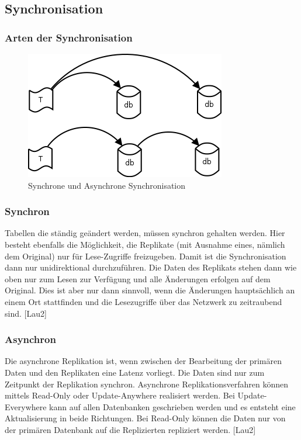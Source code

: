 \documentclass[letterpaper, 12pt]{article}
\let\tempsubsection\subsection
\renewcommand\subsection[1]{\vspace{0cm}\tempsubsection{#1}\vspace{0cm}}
\let\tempsubsubsection\subsubsection
\renewcommand\subsubsection[1]{\vspace{0cm}\tempsubsubsection{#1}\vspace{0cm}}
\begin{document}
\subsection{Synchronisation}
\subsubsection{Arten der Synchronisation}
\begin{figure}[hp]
\centering
\includegraphics[scale=0.80]{syn.png}
\caption{Synchrone und Asynchrone Synchronisation}
\label{syn}
\end{figure}
\subsubsection{Synchron}
Tabellen die ständig geändert werden, müssen synchron gehalten werden. Hier besteht ebenfalls die Möglichkeit, die Replikate (mit Ausnahme eines, nämlich dem Original) nur für Lese-Zugriffe freizugeben. Damit ist die Synchronisation dann nur unidirektional durchzuführen. Die Daten des Replikats stehen dann wie oben nur zum Lesen zur Verfügung und alle Änderungen erfolgen auf dem Original. Dies ist aber nur dann sinnvoll, wenn die Änderungen hauptsächlich an einem Ort stattfinden und die Lesezugriffe über das Netzwerk zu zeitraubend sind. [Lau2]
\subsubsection{Asynchron}
Die asynchrone Replikation ist, wenn zwischen der Bearbeitung der primären Daten und den Replikaten eine Latenz vorliegt. Die Daten sind nur zum Zeitpunkt der Replikation synchron. Asynchrone Replikationsverfahren können mittels Read-Only oder Update-Anywhere realisiert werden. Bei Update-Everywhere kann auf allen Datenbanken geschrieben werden und es entsteht eine Aktualisierung in beide Richtungen. Bei Read-Only können die Daten nur von der primären Datenbank auf die Replizierten repliziert werden. [Lau2]
\end{document}
